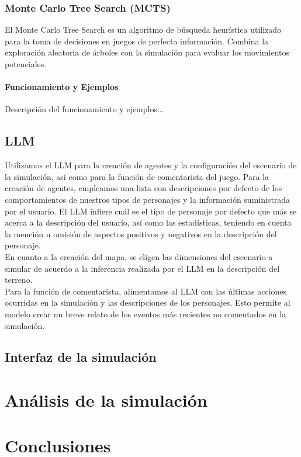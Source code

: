 \documentclass[11pt]{article}
\begin{document}
\subsubsection{Monte Carlo Tree Search (MCTS)}
El Monte Carlo Tree Search es un algoritmo de búsqueda heurística utilizado para la toma de decisiones en juegos de perfecta información. Combina la exploración aleatoria de árboles con la simulación para evaluar los movimientos potenciales.

\paragraph{Funcionamiento y Ejemplos}
Descripción del funcionamiento y ejemplos...



\subsection{LLM}
Utilizamos el LLM para la creación de agentes y la configuración del escenario de la simulación, así como para la función de comentarista del juego. Para la creación de agentes, empleamos una lista con descripciones por defecto de los comportamientos de nuestros tipos de personajes y la información suministrada por el usuario. El LLM infiere cuál es el tipo de personaje por defecto que más se acerca a la descripción del usuario, así como las estadísticas, teniendo en cuenta la mención u omisión de aspectos positivos y negativos en la descripción del personaje.
\\
En cuanto a la creación del mapa, se eligen las dimensiones del escenario a simular de acuerdo a la inferencia realizada por el LLM en la descripción del terreno.  \\
Para la función de comentarista, alimentamos al LLM con las últimas acciones ocurridas en la simulación y las descripciones de los personajes. Esto permite al modelo crear un breve relato de los eventos más recientes no comentados en la simulación.
\subsection{Interfaz de la simulación}

\section{Análisis de la simulación}
\section{Conclusiones}
\end{document}
